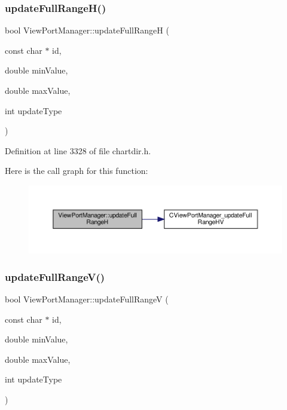 \subsubsection{\texorpdfstring{update\+Full\+Range\+H()}{updateFullRangeH()}}
{\footnotesize\ttfamily bool View\+Port\+Manager\+::update\+Full\+RangeH (\begin{DoxyParamCaption}\item[{const char $\ast$}]{id,  }\item[{double}]{min\+Value,  }\item[{double}]{max\+Value,  }\item[{int}]{update\+Type }\end{DoxyParamCaption})\hspace{0.3cm}{\ttfamily [inline]}}



Definition at line 3328 of file chartdir.\+h.

Here is the call graph for this function\+:
\nopagebreak
\begin{figure}[H]
\begin{center}
\leavevmode
\includegraphics[width=350pt]{class_view_port_manager_a007141f50fa8ae8ad2f80bd10c5f097f_cgraph}
\end{center}
\end{figure}
\mbox{\label{class_view_port_manager_ac54ae9b215ca55fc30cfe5cbacfe0865}} 
\subsubsection{\texorpdfstring{update\+Full\+Range\+V()}{updateFullRangeV()}}
{\footnotesize\ttfamily bool View\+Port\+Manager\+::update\+Full\+RangeV (\begin{DoxyParamCaption}\item[{const char $\ast$}]{id,  }\item[{double}]{min\+Value,  }\item[{double}]{max\+Value,  }\item[{int}]{update\+Type }\end{DoxyParamCaption})\hspace{0.3cm}{\ttfamily [inline]}}



